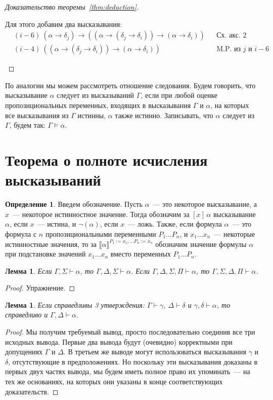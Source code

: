 \documentclass[a4paper,11pt]{article}
\newtheorem{lmm}[thm]{Лемма}
\theoremstyle{definition}
\newtheorem{dfn}[thm]{Определение}
\newcommand{\sem}[2]{\llbracket #1 \rrbracket^{#2}}
\newcommand{\proves}{\vdash}
\begin{document}
\begin{proof}[Доказательство теоремы~\ref{thm:deduction}]
\begin{enumerate}
  Для этого добавим два высказывания:
  \begin{align*}
  &(i-6)\ (\alpha \to \delta_j) \to ((\alpha \to (\delta_j \to \delta_i)) \to (\alpha \to \delta_i)) &&\text{Сх. акс. 2}\\
  &(i-4)\ ((\alpha \to (\delta_j \to \delta_i)) \to (\alpha \to \delta_i)) &&\text{M.P. из } j \text{ и } i-6
  \end{align*}
\end{enumerate}
\end{proof}

По аналогии мы можем рассмотреть отношение следования. Будем говорить, что
высказывание $\alpha$ следует из высказываний $\Gamma$, если при любой оценке
пропозициональных переменных, входящих в высказывания $\Gamma$ и $\alpha$, на
которых все высказывания из $\Gamma$ истинны, $\alpha$ также истинно.
Записывать, что $\alpha$ следует из $\Gamma$, будем так: $\Gamma \models \alpha$.

\section{Теорема о полноте исчисления высказываний}
\begin{dfn}
Введем обозначение. Пусть $\alpha$~--- это некоторое высказывание, а $x$~---
некоторое истинностное значение. Тогда обозначим за $[x]\,\alpha$ высказывание
$\alpha$, если $x$~--- истина, и $\neg(\alpha)$, если $x$~--- ложь. Также, если
формула $\alpha$~--- это формула с $n$ пропозициональными переменными $P_1
\dots P_n$, и $x_1 \dots x_n$~--- некоторые истинностные значения, то за
$\sem{\alpha}{P_1:=x_1,\dots P_n:=x_n}$ обозначим значение формулы $\alpha$ при
подстановке значений $x_1 \dots x_n$ вместо переменных $P_1 \dots P_n$.
\end{dfn}

\begin{lmm}\label{lmm:weak}
Если $\Gamma, \Sigma \proves \alpha$, то $\Gamma, \Delta, \Sigma \proves
\alpha$. Если $\Gamma, \Delta, \Sigma, \Pi \proves \alpha$, то $\Gamma, \Sigma,
\Delta, \Pi \proves \alpha$.
\end{lmm}
\begin{proof}
Упражнение.
\end{proof}

\begin{lmm}\label{lmm:concat}
Если справедливы 3 утверждения: $\Gamma \proves \gamma$, $\Delta \proves
\delta$ и $\gamma, \delta \proves \alpha$, то справедливо и $\Gamma, \Delta
\proves \alpha$.
\end{lmm}
\begin{proof}
Мы получим требуемый вывод, просто последовательно соединив все три исходных
вывода. Первые два вывода будут (очевидно) корректными при допущениях $\Gamma$ и
$\Delta$. В третьем же выводе могут использоваться высказывания $\gamma$ и
$\delta$, отсутствующие в предположениях. Но поскольку эти высказывания доказаны
в первых двух частях вывода, мы будем иметь полное право их упоминать~--- на тех
же основаниях, на которых они указаны в конце соответствующих доказательств.
\end{proof}
\end{document}
